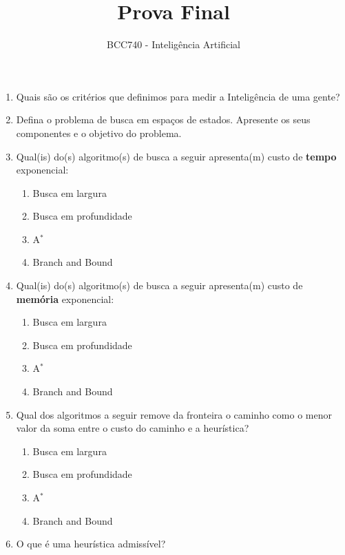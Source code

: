 \documentclass[a4paper,12pt]{exam}
\title{\vspace{-2.5cm} Prova Final}
\author{BCC740 - Inteligência Artificial}
\begin{document}
\maketitle

\begin{enumerate}

    \item Quais são os critérios que definimos para medir a Inteligência de uma gente?

    \item Defina o problema de busca em espaços de estados. Apresente os seus componentes e o objetivo do problema.
    
    \item Qual(is) do(s) algoritmo(s) de busca a seguir apresenta(m) custo de \textbf{tempo} exponencial:
    \begin{enumerate}
        \item Busca em largura
        \item Busca em profundidade
        \item A$^*$
        \item Branch and Bound
    \end{enumerate}

    \item Qual(is) do(s) algoritmo(s) de busca a seguir apresenta(m) custo de \textbf{memória} exponencial:
    \begin{enumerate}
        \item Busca em largura
        \item Busca em profundidade
        \item A$^*$
        \item Branch and Bound
    \end{enumerate}

    \item Qual dos algoritmos a seguir remove da fronteira o caminho como o menor valor da soma entre o custo do caminho e a heurística?
    \begin{enumerate}
        \item Busca em largura
        \item Busca em profundidade
        \item A$^*$
        \item Branch and Bound
    \end{enumerate}

    \item O que é uma heurística admissível?


\end{enumerate}
\end{document}
